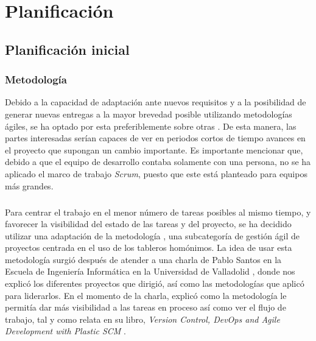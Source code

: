 \documentclass{subfiles}
\begin{document}
    \chapter{Planificación}
    \label{chap:planificacion}

        \section{Planificación inicial}
        \label{sec:planificacion_inicial}

        \subsection{Metodología}
        \label{sec:metodologia}
        
        {Debido a la capacidad de adaptación ante nuevos requisitos y a la posibilidad de generar nuevas entregas a la mayor brevedad posible utilizando metodologías ágiles, se ha optado por esta preferiblemente sobre otras \cite{agilewebsite}. De esta manera, las partes interesadas serían capaces de ver en periodos cortos de tiempo avances en el proyecto que supongan un cambio importante. Es importante mencionar que, debido a que el equipo de desarrollo contaba solamente con una persona, no se ha aplicado el marco de trabajo \textit{Scrum}, puesto que este está planteado para equipos más grandes.}
        
        \paragraph{}
        {Para centrar el trabajo en el menor número de tareas posibles al mismo tiempo, y favorecer la visibilidad del estado de las tareas y del proyecto, se ha decidido utilizar una adaptación de la metodología \Kanban\cite{web:kanban}, una subcategoría de gestión ágil de proyectos centrada en el uso de los tableros homónimos. La idea de usar esta metodología surgió después de atender a una charla de Pablo Santos en la Escuela de Ingeniería Informática en la Universidad de Valladolid \cite{web:pablosantos}, donde nos explicó los diferentes proyectos que dirigió, así como las metodologías que aplicó para liderarlos. En el momento de la charla, explicó como la metodología \Kanban le permitía dar más visibilidad a las tareas en proceso así como ver el flujo de trabajo, tal y como relata en su libro, \textit{Version Control, DevOps and Agile Development with Plastic SCM} \cite{book:santos_pablo_versioncontrol}.}
\end{document}
